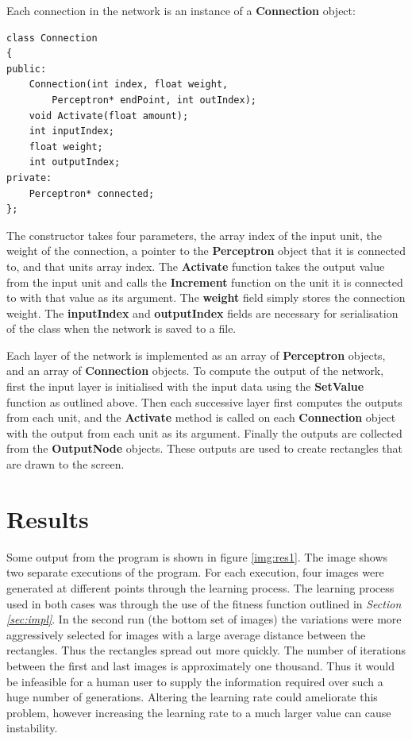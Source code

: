 \documentclass{acm_proc_article-sp}
\begin{document}
\vspace{4.2mm}

Each connection in the network is an instance of a \textbf{Connection} object:

\begin{verbatim}
class Connection
{
public:
    Connection(int index, float weight, 
        Perceptron* endPoint, int outIndex);
    void Activate(float amount);
    int inputIndex;
    float weight;
    int outputIndex;
private:
    Perceptron* connected;
};
\end{verbatim}

The constructor takes four parameters, the array index of the input unit, the weight of the connection, a pointer to the \textbf{Perceptron} object that it is connected to, and that units array index. The \textbf{Activate} function takes the output value from the input unit and calls the \textbf{Increment} function on the unit it is connected to with that value as its argument. The \textbf{weight} field simply stores the connection weight. The \textbf{inputIndex} and \textbf{outputIndex} fields are necessary for serialisation of the class when the network is saved to a file.

\vspace{3mm}

Each layer of the network is implemented as an array of \textbf{Perceptron} objects, and an array of \textbf{Connection} objects. To compute the output of the network, first the input layer is initialised with the input data using the \textbf{SetValue} function as outlined above. Then each successive layer first computes the outputs from each unit, and the \textbf{Activate} method is called on each \textbf{Connection} object with the output from each unit as its argument. Finally the outputs are collected from the \textbf{OutputNode} objects. These outputs are used to create rectangles that are drawn to the screen. 

\section{Results}
\label{sec:results}

Some output from the program is shown in figure \ref{img:res1}. The image shows two separate executions of the program. For each execution, four images were generated at different points through the learning process. The learning process used in both cases was through the use of the fitness function outlined in \textit{Section \ref{sec:impl}}. In the second run (the bottom set of images) the variations were more aggressively selected for images with a large average distance between the rectangles. Thus the rectangles spread out more quickly. The number of iterations between the first and last images is approximately one thousand. Thus it would be infeasible for a human user to supply the information required over such a huge number of generations. Altering the learning rate could ameliorate this problem, however increasing the learning rate to a much larger value can cause instability. 
\end{document}
